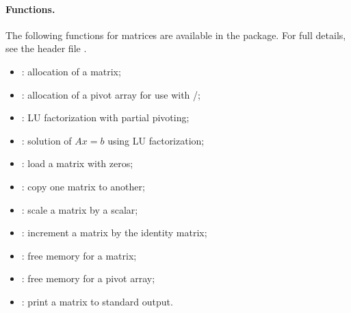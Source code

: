 \paragraph{Functions.}
The following functions for  matrices are available
in the {\band} package.  For full details, see the header file .
\begin{itemize}
\item {}: allocation of a  matrix;
\item {}: allocation of a pivot array for use
      with /;
\item {}: LU factorization with partial pivoting;
\item {}: solution of $Ax = b$ using LU factorization;
\item {}: load a matrix with zeros;
\item {}: copy one matrix to another;
\item {}: scale a matrix by a scalar;
\item {}: increment a matrix by the identity matrix;
\item {}: free memory for a  matrix;
\item {}: free memory for a pivot array;
\item {}: print a  matrix to standard output.
\end{itemize}
